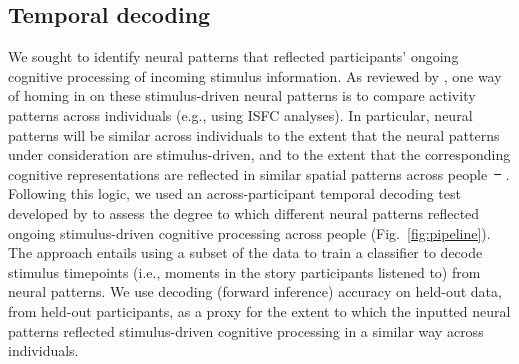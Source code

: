 \documentclass[english]{article}
\providecommand{\DIFaddtex}[1]{{\protect\color{blue}\uwave{#1}}} %
\providecommand{\DIFdeltex}[1]{{\protect\color{red}\sout{#1}}}                      %
\providecommand{\DIFaddbegin}{} %
\providecommand{\DIFaddend}{} %
\providecommand{\DIFdelbegin}{} %
\providecommand{\DIFdelend}{} %
\providecommand{\DIFadd}[1]{\texorpdfstring{\DIFaddtex{#1}}{#1}} %
\providecommand{\DIFdel}[1]{\texorpdfstring{\DIFdeltex{#1}}{}} %
\newcommand{\DIFscaledelfig}{0.5}
\newlength{\DIFdelgraphicswidth} %
\newlength{\DIFdelgraphicsheight} %
\newcommand{\DIFaddincludegraphics}[2][]{{\color{blue}\fbox{\DIFOincludegraphics[#1]{#2}}}} %
\newcommand{\DIFdelincludegraphics}[2][]{%
\sbox{\DIFdelgraphicsbox}{\DIFOincludegraphics[#1]{#2}}%
\settoboxwidth{\DIFdelgraphicswidth}{\DIFdelgraphicsbox} %
\settoboxtotalheight{\DIFdelgraphicsheight}{\DIFdelgraphicsbox} %
\scalebox{\DIFscaledelfig}{%
\parbox[b]{\DIFdelgraphicswidth}{\usebox{\DIFdelgraphicsbox}\\[-\baselineskip] \rule{\DIFdelgraphicswidth}{0em}}\llap{\resizebox{\DIFdelgraphicswidth}{\DIFdelgraphicsheight}{%
\setlength{\unitlength}{\DIFdelgraphicswidth}%
\begin{picture}(1,1)%
\thicklines\linethickness{2pt} %
{\color[rgb]{1,0,0}\put(0,0){\framebox(1,1){}}}%
{\color[rgb]{1,0,0}\put(0,0){\line( 1,1){1}}}%
{\color[rgb]{1,0,0}\put(0,1){\line(1,-1){1}}}%
\end{picture}%
}\hspace*{3pt}}} %
} %
\DeclareRobustCommand{\DIFaddbegin}{\DIFOaddbegin \let\includegraphics\DIFaddincludegraphics} %
\DeclareRobustCommand{\DIFaddend}{\DIFOaddend \let\includegraphics\DIFOincludegraphics} %
\DeclareRobustCommand{\DIFdelbegin}{\DIFOdelbegin \let\includegraphics\DIFdelincludegraphics} %
\DeclareRobustCommand{\DIFdelend}{\DIFOaddend \let\includegraphics\DIFOincludegraphics} %
\begin{document}
\subsection*{Temporal decoding}
We sought to identify neural patterns that reflected participants'
ongoing cognitive processing of incoming stimulus information.  As
reviewed by \cite{SimoEtal16}, one way of homing in on these
stimulus-driven neural patterns is to compare activity patterns across
individuals (e.g., using ISFC analyses).  In particular, neural
patterns will be similar across individuals to the extent that the
neural patterns under consideration are stimulus-driven, and to the
extent that the corresponding cognitive representations are reflected
in similar spatial patterns across people~\DIFdelbegin \DIFdel{\mbox{%
\citep[also see][]{SimoChan20}}\hspace{0pt}%
}\DIFdelend \DIFaddbegin \DIFadd{\mbox{%
\cite{SimoChan20}}\hspace{0pt}%
}\DIFaddend .  Following this logic, we
used an across-participant temporal decoding test developed by
\cite{MannEtal18} to assess the degree to which different neural
patterns reflected ongoing stimulus-driven cognitive processing across
people (Fig.~\ref{fig:pipeline}).  The approach entails using a subset of the data to train a
classifier to decode stimulus timepoints (i.e., moments in the story
participants listened to) from neural patterns.  We use decoding
(forward inference) accuracy on held-out data, from held-out
participants, as a proxy for the extent to which the inputted neural
patterns reflected stimulus-driven cognitive processing in a similar
way across individuals.
\end{document}
